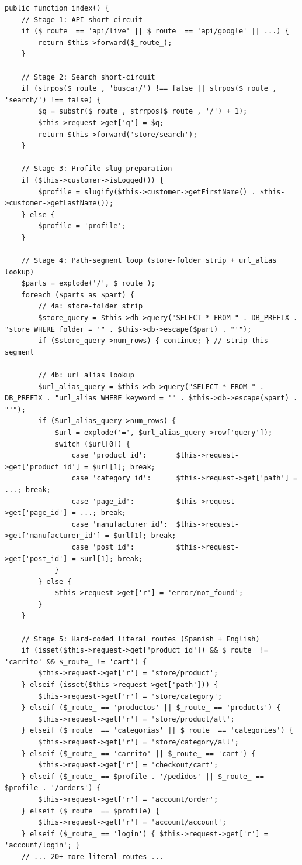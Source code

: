 \documentclass[11pt,a4paper]{article}
\begin{document}
\begin{lstlisting}[caption={\texttt{app/shop/controller/common/seo\_url.php} --- the 6-stage algorithm (abridged).},label={lst:seo-url}]
public function index() {
    // Stage 1: API short-circuit
    if ($_route_ == 'api/live' || $_route_ == 'api/google' || ...) {
        return $this->forward($_route_);
    }

    // Stage 2: Search short-circuit
    if (strpos($_route_, 'buscar/') !== false || strpos($_route_, 'search/') !== false) {
        $q = substr($_route_, strrpos($_route_, '/') + 1);
        $this->request->get['q'] = $q;
        return $this->forward('store/search');
    }

    // Stage 3: Profile slug preparation
    if ($this->customer->isLogged()) {
        $profile = slugify($this->customer->getFirstName() . $this->customer->getLastName());
    } else {
        $profile = 'profile';
    }

    // Stage 4: Path-segment loop (store-folder strip + url_alias lookup)
    $parts = explode('/', $_route_);
    foreach ($parts as $part) {
        // 4a: store-folder strip
        $store_query = $this->db->query("SELECT * FROM " . DB_PREFIX . "store WHERE folder = '" . $this->db->escape($part) . "'");
        if ($store_query->num_rows) { continue; } // strip this segment

        // 4b: url_alias lookup
        $url_alias_query = $this->db->query("SELECT * FROM " . DB_PREFIX . "url_alias WHERE keyword = '" . $this->db->escape($part) . "'");
        if ($url_alias_query->num_rows) {
            $url = explode('=', $url_alias_query->row['query']);
            switch ($url[0]) {
                case 'product_id':       $this->request->get['product_id'] = $url[1]; break;
                case 'category_id':      $this->request->get['path'] = ...; break;
                case 'page_id':          $this->request->get['page_id'] = ...; break;
                case 'manufacturer_id':  $this->request->get['manufacturer_id'] = $url[1]; break;
                case 'post_id':          $this->request->get['post_id'] = $url[1]; break;
            }
        } else {
            $this->request->get['r'] = 'error/not_found';
        }
    }

    // Stage 5: Hard-coded literal routes (Spanish + English)
    if (isset($this->request->get['product_id']) && $_route_ != 'carrito' && $_route_ != 'cart') {
        $this->request->get['r'] = 'store/product';
    } elseif (isset($this->request->get['path'])) {
        $this->request->get['r'] = 'store/category';
    } elseif ($_route_ == 'productos' || $_route_ == 'products') {
        $this->request->get['r'] = 'store/product/all';
    } elseif ($_route_ == 'categorias' || $_route_ == 'categories') {
        $this->request->get['r'] = 'store/category/all';
    } elseif ($_route_ == 'carrito' || $_route_ == 'cart') {
        $this->request->get['r'] = 'checkout/cart';
    } elseif ($_route_ == $profile . '/pedidos' || $_route_ == $profile . '/orders') {
        $this->request->get['r'] = 'account/order';
    } elseif ($_route_ == $profile) {
        $this->request->get['r'] = 'account/account';
    } elseif ($_route_ == 'login') { $this->request->get['r'] = 'account/login'; }
    // ... 20+ more literal routes ...


\end{lstlisting}
\end{document}
